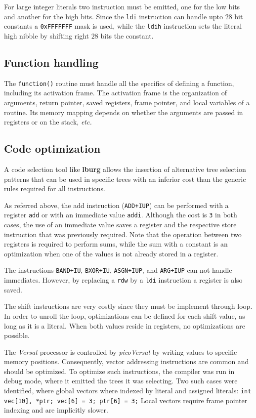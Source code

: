 \documentclass[journal]{IEEEtran}
\begin{document}
For large integer literals two instruction must be emitted,
one for the low bits and another for the high bits.
Since the {\tt ldi} instruction can handle upto $28$ bit constants a
{\tt 0xFFFFFFF} mask is used, while the {\tt ldih} instruction sets
the literal high nibble by shifting right $28$ bits the constant.

\subsection{Function handling}

The {\tt function()} routine must handle all the specifics
of defining a function, including its activation frame.
The activation frame is the organization of arguments,
return pointer, saved registers, frame pointer, and
local variables of a routine.
Its memory mapping depends on whether the arguments are
passed in registers or on the stack, {\it etc.}

\subsection{Code optimization}

A code selection tool like {\bf lburg} allows the insertion of
alternative tree selection patterns that can be used in specific
trees with an inferior cost than the generic rules required
for all instructions.

As referred above, the add instruction ({\tt ADD+IUP}) can be
performed with a register {\tt add} or with an immediate
value {\tt addi}.
Although the cost is {\tt 3} in both cases, the use of an immediate
value saves a register and the respective store instruction that
was previously required.
Note that the operation between two registers is required to perform
sums, while the sum with a constant is an optimization when one
of the values is not already stored in a register.

The instructions {\tt BAND+IU}, {\tt BXOR+IU}, {\tt ASGN+IUP}, and
{\tt ARG+IUP} can not handle immediates.
However, by replacing a {\tt rdw} by a {\tt ldi} instruction
a register is also saved.

The shift instructions are very costly since they
must be implement through loop.
In order to unroll the loop, optimizations can be
defined for each shift value, as long as it is a literal.
When both values reside in registers, no optimizations
are possible.

The {\it Versat} processor is controlled by {\it picoVersat} by
writing values to specific memory positions.
Consequently, vector addressing instructions are common and should
be optimized.
To optimize such instructions, the compiler was run in debug
mode, where it emitted the trees it was selecting.
Two such cases were identified, where global vectors where
indexed by literal and assigned literals:
{\tt int vec[10], *ptr; vec[6] = 3; ptr[6] = 3;}
Local vectors require frame pointer indexing and are implicitly
slower.
\end{document}
